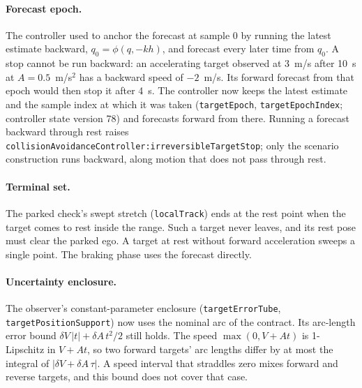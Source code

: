 \documentclass[11pt]{article}
\begin{document}
\paragraph{Forecast epoch.}
The controller used to anchor the forecast at sample 0 by running the latest
estimate backward, $q_0=\phi(q,-kh)$, and forecast every later time from
$q_0$. A stop cannot be run backward: an accelerating target observed at
3~m/s after 10~s at $A=0.5$~m/s$^2$ has a backward speed of $-2$~m/s. Its
forward forecast from that epoch would then stop it after 4~s. The
controller now keeps the latest estimate and the sample index at which it
was taken (\texttt{targetEpoch}, \texttt{targetEpochIndex}; controller state
version 78) and forecasts forward from there. Running a forecast backward
through rest raises \texttt{collisionAvoidanceController:irreversibleTargetStop};
only the scenario construction runs backward, along motion that does not
pass through rest.

\paragraph{Terminal set.}
The parked check's swept stretch (\texttt{localTrack}) ends at the rest point
when the target comes to rest inside the range. Such a target never leaves,
and its rest pose must clear the parked ego. A target at rest without
forward acceleration sweeps a single point. The braking phase uses the
forecast directly.

\paragraph{Uncertainty enclosure.}
The observer's constant-parameter enclosure (\texttt{targetErrorTube},
\texttt{targetPositionSupport}) now uses the nominal arc of the contract.
Its arc-length error bound $\delta V\,|t|+\delta A\,t^2/2$ still holds. The
speed $\max(0,V+At)$ is 1-Lipschitz in $V+At$, so two forward targets'
arc lengths differ by at most the integral of $|\delta V+\delta A\,\tau|$.
A speed interval that straddles zero mixes forward and reverse targets, and
this bound does not cover that case.
\end{document}
